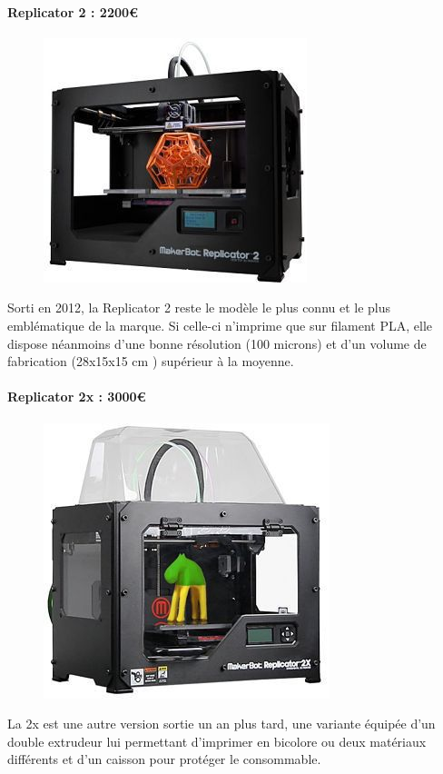 \documentclass{article}
\begin{document}
\paragraph{Replicator 2 : 2200\euro{}} \hfill
\begin{figure}[h!]
\centering
\includegraphics[scale=0.4]{./images/replicator2.png}
\end{figure}\hfill \break
Sorti en 2012, la Replicator 2 reste le modèle le plus connu et le plus emblématique de la marque. Si celle-ci n'imprime que sur filament PLA, elle dispose néanmoins d'une bonne résolution (100 microns) et d'un volume de fabrication (28x15x15 cm ) supérieur à la moyenne.

\paragraph{Replicator 2x : 3000\euro{}} \hfill
\begin{figure}[h!]
\centering
\includegraphics[scale=0.4]{./images/replicator2X.png}
\end{figure}\hfill \break
La 2x est une autre version sortie un an plus tard, une variante équipée d'un double extrudeur lui permettant d'imprimer en bicolore ou deux matériaux différents et d'un caisson pour protéger le consommable.
\newpage
\end{document}
